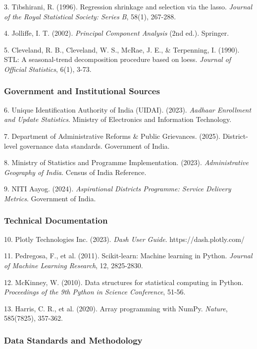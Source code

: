 \documentclass[11pt, a4paper]{article}
\begin{document}
3. Tibshirani, R. (1996). Regression shrinkage and selection via the lasso. \textit{Journal of the Royal Statistical Society: Series B}, 58(1), 267-288.


4. Jolliffe, I. T. (2002). \textit{Principal Component Analysis} (2nd ed.). Springer.


5. Cleveland, R. B., Cleveland, W. S., McRae, J. E., \& Terpenning, I. (1990). STL: A seasonal-trend decomposition procedure based on loess. \textit{Journal of Official Statistics}, 6(1), 3-73.


\subsubsection{Government and Institutional Sources}

6. Unique Identification Authority of India (UIDAI). (2023). \textit{Aadhaar Enrollment and Update Statistics}. Ministry of Electronics and Information Technology.


7. Department of Administrative Reforms \& Public Grievances. (2025). District-level governance data standards. Government of India.


8. Ministry of Statistics and Programme Implementation. (2023). \textit{Administrative Geography of India}. Census of India Reference.


9. NITI Aayog. (2024). \textit{Aspirational Districts Programme: Service Delivery Metrics}. Government of India.


\subsubsection{Technical Documentation}

10. Plotly Technologies Inc. (2023). \textit{Dash User Guide}. https:/\allowbreak /\allowbreak dash.plotly.com/\allowbreak 


11. Pedregosa, F., et al. (2011). Scikit-learn: Machine learning in Python. \textit{Journal of Machine Learning Research}, 12, 2825-2830.


12. McKinney, W. (2010). Data structures for statistical computing in Python. \textit{Proceedings of the 9th Python in Science Conference}, 51-56.


13. Harris, C. R., et al. (2020). Array programming with NumPy. \textit{Nature}, 585(7825), 357-362.


\subsubsection{Data Standards and Methodology}
\end{document}
